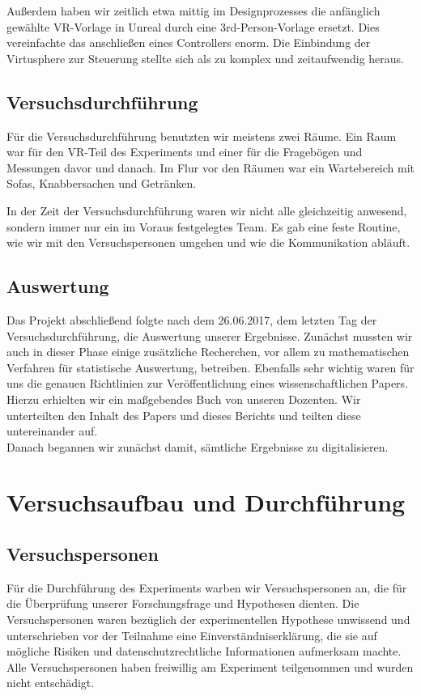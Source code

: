\documentclass{Bericht}
\begin{document}
			Außerdem haben wir zeitlich etwa mittig im Designprozesses die anfänglich gewählte VR-Vorlage in Unreal durch eine 3rd-Person-Vorlage ersetzt. Dies vereinfachte das anschließen eines Controllers enorm. Die Einbindung der Virtusphere zur Steuerung stellte sich als zu komplex und zeitaufwendig heraus. 
		
	\subsection{Versuchsdurchführung} %
		Für die Versuchsdurchführung benutzten wir meistens zwei Räume. Ein Raum war für den VR-Teil des Experiments und einer für die Fragebögen und Messungen davor und danach. Im Flur vor den Räumen war ein Wartebereich mit Sofas, Knabbersachen und Getränken. 
		
		In der Zeit der Versuchsdurchführung waren wir nicht alle gleichzeitig anwesend, sondern immer nur ein im Voraus festgelegtes Team. Es gab eine feste Routine, wie wir mit den Versuchspersonen umgehen und wie die Kommunikation abläuft. 		
	\subsection{Auswertung} %
		Das Projekt abschließend folgte nach dem 26.06.2017, dem letzten Tag der Versuchsdurchführung, die Auswertung unserer Ergebnisse.
		Zunächst mussten wir auch in dieser Phase einige zusätzliche Recherchen, vor allem zu mathematischen Verfahren für statistische Auswertung, betreiben. Ebenfalls sehr wichtig waren für uns die genauen Richtlinien zur Veröffentlichung eines wissenschaftlichen Papers. Hierzu erhielten wir ein maßgebendes Buch von unseren Dozenten. Wir unterteilten den Inhalt des Papers und dieses Berichts und teilten diese untereinander auf.\\
		Danach begannen wir zunächst damit, sämtliche Ergebnisse zu digitalisieren.

\clearpage
\section{Versuchsaufbau und Durchführung} %
	\subsection{Versuchspersonen}
Für die Durchführung des Experiments warben wir Versuchspersonen an, die für die Überprüfung unserer Forschungsfrage und Hypothesen dienten. 
Die Versuchspersonen waren bezüglich der experimentellen Hypothese unwissend und unterschrieben vor der Teilnahme eine Einverständniserklärung, die sie auf mögliche Risiken und datenschutzrechtliche Informationen aufmerksam machte. Alle Versuchspersonen haben freiwillig am Experiment teilgenommen und wurden nicht entschädigt. 
\end{document}
